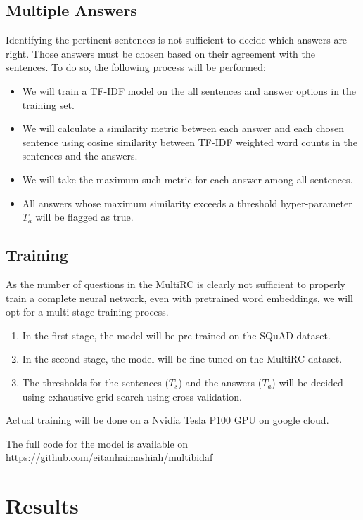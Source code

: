 \documentclass[12pt, a4paper]{article}
\begin{document}
\begin{multicols}{2}
			\subsection{Multiple Answers}
				
				Identifying the pertinent sentences is not sufficient to decide which answers are right. Those answers must be chosen based on their agreement with the sentences. To do so, the following process will be performed:
				\begin{itemize}
					\item We will train a TF-IDF model on the all sentences and answer options in the training set.
					\item We will calculate a similarity metric between each answer and each chosen sentence using cosine similarity between TF-IDF weighted word counts in the sentences and the answers.
					\item We will take the maximum such metric for each answer among all sentences.
					\item All answers whose maximum similarity exceeds a  threshold hyper-parameter $ T_a $ will be flagged as true.
				\end{itemize}
		
			\subsection{Training}
				As the number of questions in the MultiRC is clearly not sufficient to properly train a complete neural network, even with pretrained word embeddings, we will opt for a multi-stage training process.
				
				\begin{enumerate}
					\item In the first stage, the model will be pre-trained on the SQuAD dataset.
					\item In the second stage, the model will be fine-tuned on the MultiRC dataset.
					\item The thresholds for the sentences ($ T_s $) and the answers ($ T_a $) will be decided using exhaustive grid search using cross-validation.
				\end{enumerate}
				
				Actual training will be done on a Nvidia Tesla P100 GPU on google cloud.
				
				The full code for the model is available on https://github.com/eitanhaimashiah/multibidaf
			
		\section{Results}
		

\end{multicols}
\end{document}
